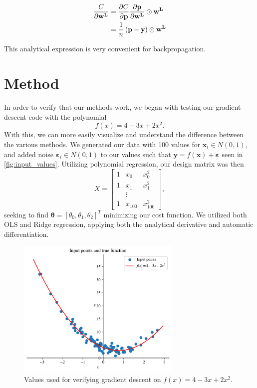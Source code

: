 \documentclass{article}
\theoremstyle{definition}
\begin{document}
\begin{align*}
    \frac{C}{\partial \mathbf{w^L}}  =& \hspace{1mm} \frac{\partial C}{\partial \mathbf{p}} \frac{\partial \mathbf{p}}{\partial \mathbf{w^L}} \odot \mathbf{w^L}
    \\
    =& \hspace{1mm} \frac{1}{n} \left( \mathbf{p} - \mathbf{y}\right) \odot \mathbf{w^L}
\end{align*}

This analytical expression is very convenient for backpropagation.


\newpage
\section{Method}
In order to verify that our methods work, we began with testing our gradient descent code with the polynomial
\begin{equation}\label{eq:simplepoly}
    f(x) = 4 - 3x + 2x^2.
\end{equation}
With this, we can more easily visualize and understand the difference between the various methods. We generated our data with 100 values for $\boldsymbol{x}_i \in N(0, 1)$, and added noise $\boldsymbol{\varepsilon}_i \in N(0, 1)$ to our values such that $\boldsymbol{y} = f(\boldsymbol{x}) + \boldsymbol{\varepsilon}$ seen in \autoref{fig:input_values}. Utilizing polynomial regression, our design matrix was then
\begin{equation}
    X = \begin{bmatrix}
        1 & x_0 & x_0^2 \\
        1 & x_1 & x_1^2 \\
        & \vdots & \\
        1 & x_{100} & x_{100}^2
    \end{bmatrix},
    \label{eq:design}
\end{equation}
seeking to find $\boldsymbol{\theta} = [\theta_0, \theta_1, \theta_2]^T$ minimizing our cost function. We utilized both OLS and Ridge regression, applying both the analytical derivative and automatic differentiation.

\begin{figure}[ht]
    \centering
    \includegraphics[width=0.7\textwidth]{Project2/figures/polynomial_grad/input_points.pdf}
    \caption{Values used for verifying gradient descent on $f(x) = 4 - 3x + 2x^2$.}
    \label{fig:input_values}
\end{figure}
\end{document}
